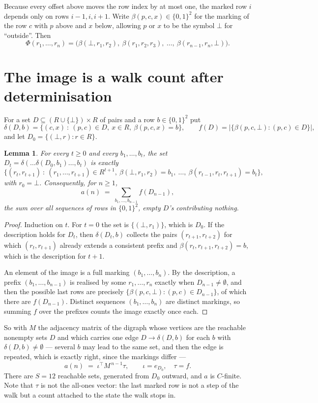 \documentclass[11pt,a4paper]{article}
\theoremstyle{plain}
\newtheorem{lemma}[theorem]{Lemma}
\theoremstyle{definition}
\begin{document}
Because every offset above moves the row index by at most one, the marked row $i$ depends only
on rows $i-1,i,i+1$. Write $\beta(p,c,x)\in\{0,1\}^{2}$ for the marking of the row $c$
with $p$ above and $x$ below, allowing $p$ or $x$ to be the symbol $\bot$ for ``outside''.
Then
\[
\Phi(r_1,\dots,r_n)=\bigl(\beta(\bot,r_1,r_2),\ \beta(r_1,r_2,r_3),\ \dots,\
\beta(r_{n-1},r_n,\bot)\bigr).
\]

\section{The image is a walk count after determinisation}

For a set $D\subseteq(R\cup\{\bot\})\times R$ of pairs and a row $b\in\{0,1\}^{2}$ put
\[
\delta(D,b)=\{(c,x)\ :\ (p,c)\in D,\ x\in R,\ \beta(p,c,x)=b\},\qquad
f(D)=\bigl|\{\beta(p,c,\bot):(p,c)\in D\}\bigr| ,
\]
and let $D_0=\{(\bot,r):r\in R\}$.

\begin{lemma}\label{lem:det}
For every $t\ge0$ and every $b_1,\dots,b_t$, the set
$D_t=\delta(\dots\delta(D_0,b_1)\dots,b_t)$ is exactly
\[
\{(r_t,r_{t+1})\ :\ (r_1,\dots,r_{t+1})\in R^{t+1},\ \beta(\bot,r_1,r_2)=b_1,\ \dots,\
\beta(r_{t-1},r_t,r_{t+1})=b_t\} ,
\]
with $r_0=\bot$. Consequently, for $n\ge1$,
\[
a(n)\;=\;\sum_{b_1,\dots,b_{n-1}}f(D_{n-1}),
\]
the sum over all sequences of rows in $\{0,1\}^{2}$, empty $D$'s contributing nothing.
\end{lemma}

\begin{proof}
Induction on $t$. For $t=0$ the set is $\{(\bot,r_1)\}$, which is $D_0$. If the description
holds for $D_t$, then $\delta(D_t,b)$ collects the pairs $(r_{t+1},r_{t+2})$ for which
$(r_t,r_{t+1})$ already extends a consistent prefix and
$\beta(r_t,r_{t+1},r_{t+2})=b$, which is the description for $t+1$.

An element of the image is a full marking $(b_1,\dots,b_n)$. By the description, a prefix
$(b_1,\dots,b_{n-1})$ is realised by some $r_1,\dots,r_n$ exactly when $D_{n-1}\neq
\emptyset$, and then the possible last rows are precisely
$\{\beta(p,c,\bot):(p,c)\in D_{n-1}\}$, of which there are $f(D_{n-1})$. Distinct
sequences $(b_1,\dots,b_n)$ are distinct markings, so summing $f$ over the prefixes counts the
image exactly once each.
\end{proof}

So with $M$ the adjacency matrix of the digraph whose vertices are the reachable nonempty sets
$D$ and which carries one edge $D\to\delta(D,b)$ for each $b$ with $\delta(D,b)\neq\emptyset$
--- several $b$ may lead to the same set, and then the edge is repeated, which is exactly
right, since the markings differ ---
\[
a(n)\;=\;\iota^{\!\top}M^{\,n-1}\tau,\qquad \iota=e_{D_0},\quad \tau=f .
\]
There are $S=12$ reachable sets, generated from $D_0$ outward, and $a$ is $C$-finite. Note
that $\tau$ is not the all-ones vector: the last marked row is not a step of the walk but a
count attached to the state the walk stops in.
\end{document}

